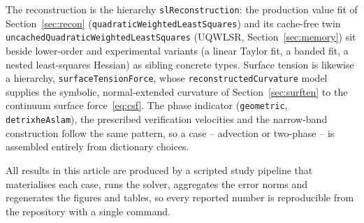 \documentclass[preprint,3p,11pt]{elsarticle}
\begin{document}
The reconstruction is the hierarchy \texttt{slReconstruction}: the production value fit of
Section~\ref{sec:recon} (\texttt{quadraticWeightedLeastSquares}) and its cache-free twin
\texttt{uncachedQuadraticWeightedLeastSquares} (UQWLSR, Section~\ref{sec:memory}) sit
beside lower-order and experimental variants (a linear Taylor fit, a banded fit, a nested
least-squares Hessian) as sibling concrete types. Surface tension is likewise a hierarchy,
\texttt{surfaceTensionForce}, whose \texttt{reconstructedCurvature} model supplies the
symbolic, normal-extended curvature of Section~\ref{sec:surften} to the continuum surface
force~\eqref{eq:csf}. The phase indicator (\texttt{geometric}, \texttt{detrixheAslam}), the
prescribed verification velocities and the narrow-band construction follow the same
pattern, so a case -- advection or two-phase -- is assembled entirely from dictionary
choices.

All results in this article are produced by a scripted study pipeline that materialises
each case, runs the solver, aggregates the error norms and regenerates the figures and
tables, so every reported number is reproducible from the repository with a single
command.
\end{document}
